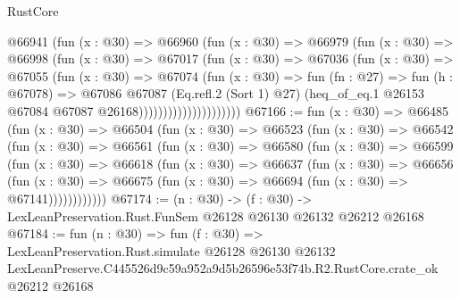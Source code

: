 \begin{lexlean}{RustCore}
\begin{coremodule}
                          @66941
                            (fun (x : @30) =>
                            @66960
                              (fun (x : @30) =>
                              @66979
                                (fun (x : @30) =>
                                @66998
                                  (fun (x : @30) =>
                                  @67017
                                    (fun (x : @30) =>
                                    @67036
                                      (fun (x : @30) =>
                                      @67055
                                        (fun (x : @30) =>
                                        @67074
                                          (fun (x : @30) =>
                                          fun (fn : @27) =>
                                          fun (h : @67078) =>
                                          @67086
                                            @67087
                                            (Eq.refl.{2} (Sort 1) @27)
                                            (heq_of_eq.{1}
                                              @26153
                                              @67084
                                              @67087
                                              @26168)))))))))))))))))))))
@67166 := fun (x : @30) =>
  @66485
    (fun (x : @30) =>
    @66504
      (fun (x : @30) =>
      @66523
        (fun (x : @30) =>
        @66542
          (fun (x : @30) =>
          @66561
            (fun (x : @30) =>
            @66580
              (fun (x : @30) =>
              @66599
                (fun (x : @30) =>
                @66618
                  (fun (x : @30) =>
                  @66637
                    (fun (x : @30) =>
                    @66656
                      (fun (x : @30) =>
                      @66675 (fun (x : @30) => @66694 (fun (x : @30) => @67141))))))))))))
@67174 := (n : @30) ->
  (f : @30) -> LexLeanPreservation.Rust.FunSem @26128 @26130 @26132 @26212 @26168
@67184 := fun (n : @30) =>
  fun (f : @30) =>
  LexLeanPreservation.Rust.simulate
    @26128
    @26130
    @26132
    LexLeanPreserve.C445526d9c59a952a9d5b26596e53f74b.R2.RustCore.crate_ok
    @26212
    @26168
\end{coremodule}
\end{lexlean}
